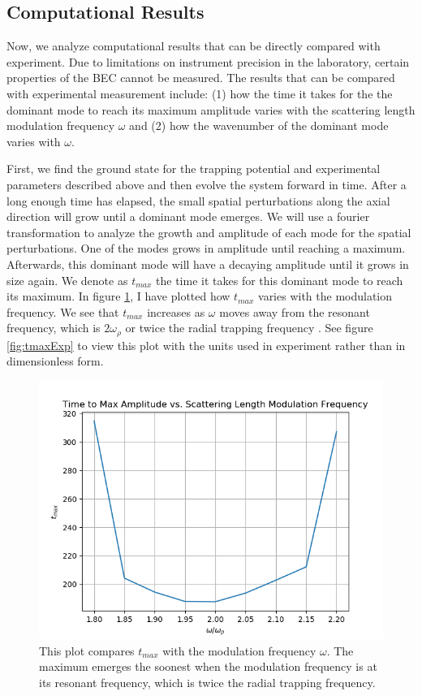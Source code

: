 \documentclass[12]{article}
\begin{document}
\subsection{Computational Results}

Now, we analyze computational results that can be directly compared with experiment. Due to limitations on instrument precision in the laboratory, certain properties of the BEC cannot be measured. The results that can be compared with experimental measurement include: (1) how the time it takes for the the dominant mode to reach its maximum amplitude varies with the scattering length modulation frequency $\omega$ and (2) how the wavenumber of the dominant mode varies with $\omega$.

First, we find the ground state for the trapping potential and experimental parameters described above and then evolve the system forward in time. After a long enough time has elapsed, the small spatial perturbations along the axial direction will grow until a dominant mode emerges. We will use a fourier transformation to analyze the growth and amplitude of each mode for the spatial perturbations. One of the modes grows in amplitude until reaching a maximum. Afterwards, this dominant mode will have a decaying amplitude until it grows in size again. We denote as $t_{max}$ the time it takes for this dominant mode to reach its maximum. In figure \ref{fig:tmaxNat}, I have plotted how $t_{max}$ varies with the modulation frequency. We see that $t_{max}$ increases as $\omega$ moves away from the resonant frequency, which is $2\omega_\rho$ or twice the radial trapping frequency \cite{mustafa}. See figure \ref{fig:tmaxExp} to view this plot with the units used in experiment rather than in dimensionless form.

\begin{figure}[H]
\centering
\includegraphics[scale=0.9]{tmaxNatUnits}
\caption{This plot compares $t_{max}$ with the modulation frequency $\omega$. The maximum emerges the soonest when the modulation frequency is at its resonant frequency, which is twice the radial trapping frequency.}
\label{fig:tmaxNat}
\end{figure}
\end{document}
